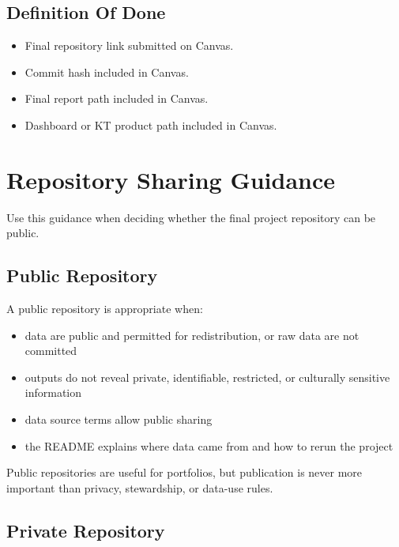 \documentclass[
  letterpaper,
  DIV=11,
  numbers=noendperiod,
  oneside]{scrreprt}
\providecommand{\tightlist}{%
  \setlength{\itemsep}{0pt}\setlength{\parskip}{0pt}}
\begin{document}
\section{Definition Of Done}\label{definition-of-done-28}

\begin{itemize}
\tightlist
\item[$\square$]
  Final repository link submitted on Canvas.
\item[$\square$]
  Commit hash included in Canvas.
\item[$\square$]
  Final report path included in Canvas.
\item[$\square$]
  Dashboard or KT product path included in Canvas.
\end{itemize}

\chapter{Repository Sharing Guidance}\label{repository-sharing-guidance}

Use this guidance when deciding whether the final project repository can
be public.

\section{Public Repository}\label{public-repository}

A public repository is appropriate when:

\begin{itemize}
\tightlist
\item
  data are public and permitted for redistribution, or raw data are not
  committed
\item
  outputs do not reveal private, identifiable, restricted, or culturally
  sensitive information
\item
  data source terms allow public sharing
\item
  the README explains where data came from and how to rerun the project
\end{itemize}

Public repositories are useful for portfolios, but publication is never
more important than privacy, stewardship, or data-use rules.

\section{Private Repository}\label{private-repository}
\end{document}
